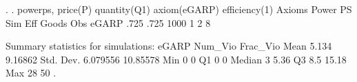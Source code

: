 . 
. powerps, price(P) quantity(Q1) axiom(eGARP) efficiency(1)
{\smallskip}
      Axioms {\VBAR}     Power         PS        Sim        Eff      Goods        Obs 
       eGARP {\VBAR}      .725       .725       1000          1          2          8 
 
Summary statistics for simulations:
{\smallskip}
       eGARP {\VBAR}   Num_Vio   Frac_Vio 
        Mean {\VBAR}     5.134    9.16862 
   Std. Dev. {\VBAR}  6.079556   10.85578 
         Min {\VBAR}         0          0 
          Q1 {\VBAR}         0          0 
      Median {\VBAR}         3       5.36 
          Q3 {\VBAR}       8.5      15.18 
         Max {\VBAR}        28         50 
{\smallskip}
{\smallskip}
. 
